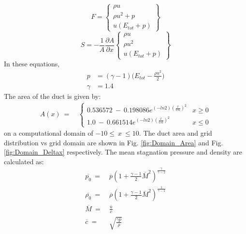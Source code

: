 \documentclass[conf]{new-aiaa}
\begin{document}
\begin{equation}
    \label{eq:Euler_F}
    F = 
    \begin{Bmatrix}
        \rho{u} \\
        \rho{u^2}+p \\
        u(E_{tot}+p)
  \end{Bmatrix}
\end{equation}
\begin{equation}
    \label{eq:Euler_S}
    S = -\frac{1}{A}\frac{\partial{A}}{\partial{x}}
    \begin{Bmatrix}
        \rho{u} \\
        \rho{u^2} \\
        u(E_{tot}+p)
  \end{Bmatrix}
\end{equation}
In these equations,
\begin{equation}
    \label{eq:Euler_pressure}
    \begin{split}
    p &= (\gamma-1)\Big(E_{tot}-\frac{\rho{u^2}}{2}\Big) \\
    \gamma &= 1.4
    \end{split}
\end{equation}
The area of the duct is given by:
\begin{equation}
	\begin{split}
		\label{eq:}
  			A(x)~=&~\left\{
  			\begin{matrix}
  				0.536572~-~0.198086e^{\left(-ln2\right)\left(\frac{x}{0.6}\right)^2} & x \geq 0 \\
  				1.0~-~0.661514e^{\left(-ln2\right)\left(\frac{x}{0.6}\right)^2} & x \leq 0
  			\end{matrix}
  			\right.
	\end{split}
\end{equation}
on a computational domain of $-10\leq~x~\leq10$. The duct area and grid distribution vs grid domain are shown in Fig. \ref{fig:Domain_Area} and Fig. \ref{fig:Domain_Deltax} respectively. 
The mean stagnation pressure and density are calculated as:
\begin{equation}
    \label{eq:Euler_BC_2}
    \begin{split}
    \overline{p_0}~= & ~\overline{p}\left(1+\frac{\gamma -1}{2}\overline{M}^2\right)^{\frac{\gamma}{\gamma-1}} \\
    \overline{\rho_0}~= & ~\overline{\rho}\left(1+\frac{\gamma -1}{2}\overline{M}^2\right)^{\frac{1}{\gamma-1}} \\
    \overline{M} ~ = & ~ \frac{\overline{u}}{\overline{c}} \\
    \overline{c} ~ = & ~ \sqrt{\frac{\gamma{\overline{p}}}{\overline{\rho}}}
    \end{split}
\end{equation}
\end{document}
